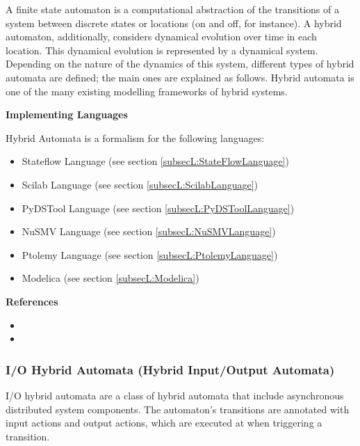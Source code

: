 A finite state automaton is a computational abstraction of the transitions of a system between discrete states or locations (on and off, for instance). A hybrid automaton, additionally, considers dynamical evolution over time in each location. This dynamical evolution is represented by a dynamical system. Depending on the nature of the dynamics of this system, different types of hybrid automata are defined; the main ones are explained as follows. Hybrid automata is one of the many existing modelling frameworks of hybrid systems.

\textbf{Implementing Languages}

Hybrid Automata is a formalism for the following languages:
\begin{itemize}
	\item Stateflow Language (see section \ref{subsecL:StateFlowLanguage})
	\item Scilab Language (see section \ref{subsecL:ScilabLanguage})
	\item PyDSTool Language (see section \ref{subsecL:PyDSToolLanguage})
	\item NuSMV Language (see section \ref{subsecL:NuSMVLanguage})
	\item Ptolemy Language (see section \ref{subsecL:PtolemyLanguage})
	\item Modelica (see section \ref{subsecL:Modelica})
\end{itemize}





\textbf{References}
\begin{itemize}
	
\item {}
	
\item {}
\end{itemize}



\subsubsection{I/O Hybrid Automata (Hybrid Input/Output Automata)}
\label{subsecF:HybridI/OHybridAutomata}


I/O hybrid automata are a class of hybrid automata that include asynchronous distributed system components. The automaton's transitions are annotated with input actions and output actions, which are executed at when triggering a transition.

